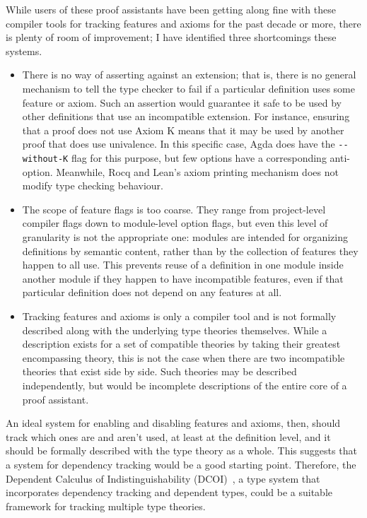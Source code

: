 \documentclass{article}
\newcommand{\code}[1]{\texttt{#1}}
\begin{document}
While users of these proof assistants have been getting along fine
with these compiler tools for tracking features and axioms for the past decade or more,
there is plenty of room of improvement;
I have identified three shortcomings these systems.
%
\begin{itemize}
  \item There is no way of asserting against an extension;
    that is, there is no general mechanism to tell the type checker to fail
    if a particular definition uses some feature or axiom.
    Such an assertion would guarantee it safe to be used by other definitions
    that use an incompatible extension.
    For instance, ensuring that a proof does not use Axiom K
    means that it may be used by another proof that does use univalence.
    In this specific case, Agda does have the \code{-{}-without-K} flag for this purpose,
    but few options have a corresponding anti-option.
    Meanwhile, Rocq and Lean's axiom printing mechanism
    does not modify type checking behaviour.
  \item The scope of feature flags is too coarse.
    They range from project-level compiler flags
    down to module-level option flags,
    but even this level of granularity is not the appropriate one:
    modules are intended for organizing definitions by semantic content,
    rather than by the collection of features they happen to all use.
    This prevents reuse of a definition in one module inside another module
    if they happen to have incompatible features,
    even if that particular definition does not depend on any features at all.
  \item Tracking features and axioms is only a compiler tool
    and is not formally described along with the underlying type theories themselves.
    While a description exists for a set of compatible theories
    by taking their greatest encompassing theory,
    this is not the case when there are two incompatible theories that exist side by side.
    Such theories may be described independently,
    but would be incomplete descriptions of the entire core of a proof assistant.
\end{itemize}

An ideal system for enabling and disabling features and axioms, then,
should track which ones are and aren't used, at least at the definition level,
and it should be formally described with the type theory as a whole.
This suggests that a system for dependency tracking would be a good starting point.
Therefore, the Dependent Calculus of Indistinguishability (DCOI)~\citep{dcoi},
a type system that incorporates dependency tracking and dependent types,
could be a suitable framework for tracking multiple type theories.
\end{document}
